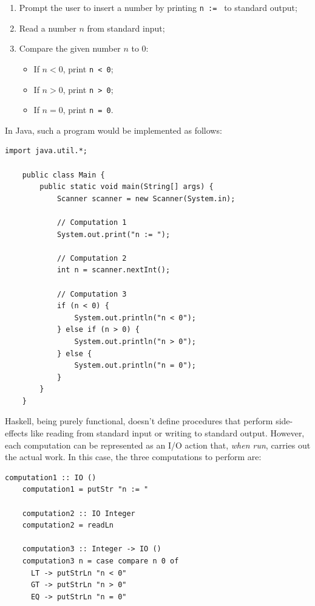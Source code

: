 \documentclass[UdineBachThesis,american,11pt]{PhdThesis}
\begin{document}
  \begin{enumerate}
    \item Prompt the user to insert a number by printing \mbox{\texttt{n :=\ }}
    to standard output;

    \item Read a number $n$ from standard input;

    \item Compare the given number $n$ to $0$:

    \begin{itemize}[noitemsep]
      \item If \mbox{$n < 0$}, print \mbox{\texttt{n < 0}};
      \item If \mbox{$n > 0$}, print \mbox{\texttt{n > 0}};
      \item If \mbox{$n = 0$}, print \mbox{\texttt{n = 0}}.
    \end{itemize}
  \end{enumerate}

  In Java, such a program would be implemented as follows:

  \begin{Verbatim}[gobble=4,fontsize=\small]
    import java.util.*;

    public class Main {
        public static void main(String[] args) {
            Scanner scanner = new Scanner(System.in);

            // Computation 1
            System.out.print("n := ");

            // Computation 2
            int n = scanner.nextInt();

            // Computation 3
            if (n < 0) {
                System.out.println("n < 0");
            } else if (n > 0) {
                System.out.println("n > 0");
            } else {
                System.out.println("n = 0");
            }
        }
    }
  \end{Verbatim}

  Haskell, being purely functional, doesn't define procedures that perform
  side-effects like reading from standard input or writing to standard output.
  However, each computation can be represented as an I/O action that, \emph{when
  run}, carries out the actual work. In this case, the three computations to
  perform are:

  \begin{Verbatim}[gobble=4,fontsize=\small]
    computation1 :: IO ()
    computation1 = putStr "n := "

    computation2 :: IO Integer
    computation2 = readLn

    computation3 :: Integer -> IO ()
    computation3 n = case compare n 0 of
      LT -> putStrLn "n < 0"
      GT -> putStrLn "n > 0"
      EQ -> putStrLn "n = 0"
  \end{Verbatim}
\end{document}

